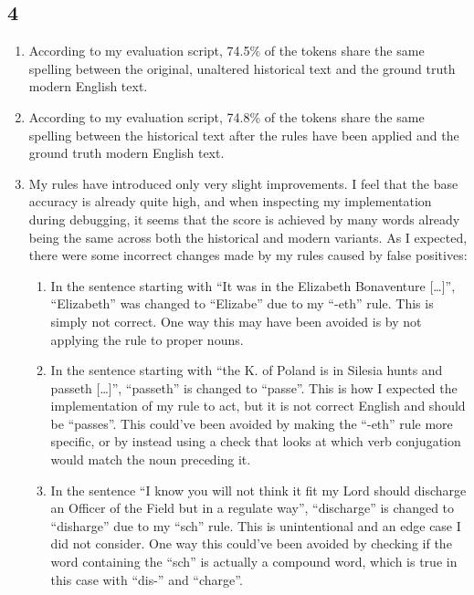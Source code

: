 \documentclass{article}
\begin{document}
\subsection{4}
\begin{enumerate}
    \item According to my evaluation script, 74.5\% of the tokens share the same spelling between the original, unaltered historical text and the ground truth modern English text.
    \item According to my evaluation script, 74.8\% of the tokens share the same spelling between the historical text after the rules have been applied and the ground truth modern English text.
    \item My rules have introduced only very slight improvements. I feel that the base accuracy is already quite high, and when inspecting my implementation during debugging, it seems that the score is achieved by many words already being the same across both the historical and modern variants. As I expected, there were some incorrect changes made by my rules caused by false positives: \begin{enumerate}
        \item In the sentence starting with ``It was in the Elizabeth Bonaventure [\dots]'', ``Elizabeth'' was changed to ``Elizabe'' due to my ``-eth'' rule. This is simply not correct. One way this may have been avoided is by not applying the rule to proper nouns.
        \item In the sentence starting with ``the K. of Poland is in Silesia hunts and passeth [\dots]'', ``passeth'' is changed to ``passe''. This is how I expected the implementation of my rule to act, but it is not correct English and should be ``passes''. This could've been avoided by making the ``-eth'' rule more specific, or by instead using a check that looks at which verb conjugation would match the noun preceding it.
        \item In the sentence ``I know you will not think it fit my Lord should discharge an Officer of the Field but in a regulate way'', ``discharge'' is changed to ``disharge'' due to my ``sch'' rule. This is unintentional and an edge case I did not consider. One way this could've been avoided by checking if the word containing the ``sch'' is actually a compound word, which is true in this case with ``dis-'' and ``charge''.
    \end{enumerate}
\end{enumerate}
\end{document}
